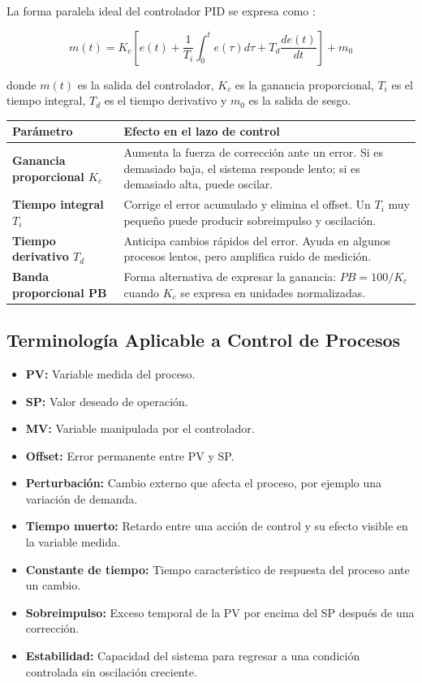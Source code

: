 \documentclass[12pt,letterpaper]{article}
\begin{document}
La forma paralela ideal del controlador PID se expresa como \cite{ogata2010}:

\begin{equation}
    m(t)=K_c\left[e(t)+\frac{1}{T_i}\int_0^t e(\tau)d\tau + T_d\frac{de(t)}{dt}\right] + m_0
\end{equation}

donde $m(t)$ es la salida del controlador, $K_c$ es la ganancia proporcional, $T_i$ es el tiempo integral, $T_d$ es el tiempo derivativo y $m_0$ es la salida de sesgo.

\begin{center}
\begin{tabular}{>{\bfseries}p{3.8cm} p{9.2cm}}
\toprule
\textbf{Parámetro} & \textbf{Efecto en el lazo de control} \\
\midrule
Ganancia proporcional $K_c$ & Aumenta la fuerza de corrección ante un error. Si es demasiado baja, el sistema responde lento; si es demasiado alta, puede oscilar. \\
\addlinespace
Tiempo integral $T_i$ & Corrige el error acumulado y elimina el offset. Un $T_i$ muy pequeño puede producir sobreimpulso y oscilación. \\
\addlinespace
Tiempo derivativo $T_d$ & Anticipa cambios rápidos del error. Ayuda en algunos procesos lentos, pero amplifica ruido de medición. \\
\addlinespace
Banda proporcional PB & Forma alternativa de expresar la ganancia: $PB=100/K_c$ cuando $K_c$ se expresa en unidades normalizadas. \\
\bottomrule
\end{tabular}
\end{center}

\subsection*{Terminología Aplicable a Control de Procesos}

\begin{itemize}[itemsep=0.25em]
    \item \textbf{PV:} Variable medida del proceso.
    \item \textbf{SP:} Valor deseado de operación.
    \item \textbf{MV:} Variable manipulada por el controlador.
    \item \textbf{Offset:} Error permanente entre PV y SP.
    \item \textbf{Perturbación:} Cambio externo que afecta el proceso, por ejemplo una variación de demanda.
    \item \textbf{Tiempo muerto:} Retardo entre una acción de control y su efecto visible en la variable medida.
    \item \textbf{Constante de tiempo:} Tiempo característico de respuesta del proceso ante un cambio.
    \item \textbf{Sobreimpulso:} Exceso temporal de la PV por encima del SP después de una corrección.
    \item \textbf{Estabilidad:} Capacidad del sistema para regresar a una condición controlada sin oscilación creciente.
\end{itemize}
\end{document}

